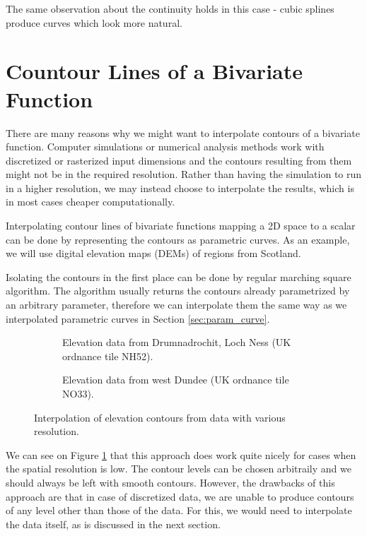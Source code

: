 \documentclass[a4paper,10pt]{report}
\begin{document}
The same observation about the continuity holds in this case - cubic splines produce curves which look more natural.

\section{Countour Lines of a Bivariate Function}
There are many reasons why we might want to interpolate contours of a bivariate function. Computer simulations or numerical analysis methods work with discretized or rasterized input dimensions and the contours resulting from them might not be in the required resolution. Rather than having the simulation to run in a higher resolution, we may instead choose to interpolate the results, which is in most cases cheaper computationally.

Interpolating contour lines of bivariate functions mapping a 2D space to a scalar can be done by representing the contours as parametric curves. As an example, we will use digital elevation maps (DEMs) of regions from Scotland.

Isolating the contours in the first place can be done by regular marching square algorithm. The algorithm usually returns the contours already parametrized by an arbitrary parameter, therefore we can interpolate them the same way as we interpolated parametric curves in Section \ref{sec:param_curve}.

\begin{figure}[H]
    \centering
    \begin{subfigure}{\textwidth}
        
    \caption{Elevation data from Drumnadrochit, Loch Ness (UK ordnance tile NH52).}
    \end{subfigure}
    \begin{subfigure}{\textwidth}
        
    \caption{Elevation data from west Dundee (UK ordnance tile NO33).}
    \end{subfigure}
    \caption{Interpolation of elevation contours from data with various resolution.}
    \label{fig:2D_contour}
\end{figure}

We can see on Figure \ref{fig:2D_contour} that this approach does work quite nicely for cases when the spatial resolution is low. The contour levels can be chosen arbitraily and we should always be left with smooth contours. However, the drawbacks of this approach are that in case of discretized data, we are unable to produce contours of any level other than those of the data. For this, we would need to interpolate the data itself, as is discussed in the next section.
\end{document}
